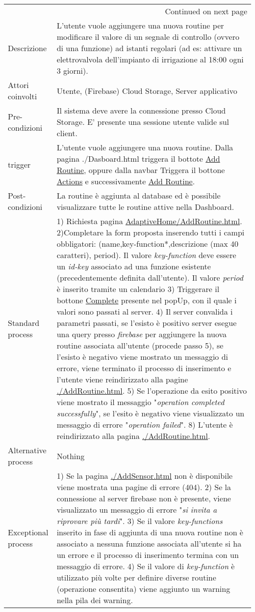 \documentclass[onecolumn,a4paper]{article}
\begin{document}
\begin{longtable}{|l|p{9.7cm}|}
\hline
\endhead
\hline\multicolumn{2}{r}{Continued on next page} \\
\endfoot
\endlastfoot
\hline
Descrizione & L'utente vuole aggiungere una nuova routine per modificare il valore di un segnale di controllo (ovvero di una funzione) ad istanti regolari (ad es: attivare un elettrovalvola dell'impianto di irrigazione al 18:00 ogni 3 giorni).\\
\hline
Attori coinvolti & Utente, (Firebase) Cloud Storage, Server applicativo\\
\hline
Pre-condizioni & Il sistema deve avere la connessione presso Cloud Storage. E' presente una sessione utente valide sul client.\\
\hline
trigger & L'utente vuole aggiungere una nuova routine. Dalla pagina ./Dasboard.html triggera il bottote \uline{Add Routine}, oppure dalla navbar Triggera il bottone \uline{Actions} e successivamente \uline{Add Routine}.\\
\hline
Post-condizioni & La routine è aggiunta al database ed è possibile visualizzare tutte le routine attive nella Dashboard.\\
\hline
Standard process & 1) Richiesta pagina \uline{AdaptiveHome/AddRoutine.html}. 2)Completare la form proposta inserendo tutti i campi obbligatori: (name,key-function*,descrizione (max 40 caratteri), period). Il valore \emph{key-function} deve essere un \emph{id-key} associato ad una funzione esistente (precedentemente definita dall'utente). Il valore \emph{period} è inserito tramite un calendario 3) Triggerare il bottone \uline{Complete} presente nel popUp, con il quale i valori sono passati al server. 4) Il server convalida i parametri passati, se l'esisto è positivo server esegue una query presso \emph{firebase} per aggiungere la nuova routine associata all'utente (procede passo 5), se l'esisto è negativo viene mostrato un messaggio di errore, viene terminato il processo di inserimento e l'utente viene reindirizzato alla pagine \uline{./AddRoutine.html}. 5) Se l'operazione da esito positivo viene mostrato il messaggio "\emph{operation completed successfully}", se l'esito è negativo viene visualizzato un messaggio di errore "\emph{operation failed}". 8) L'utente è reindirizzato alla pagina \uline{./AddRoutine.html}.\\
\hline
Alternative process & Nothing\\
\hline
Exceptional process & 1) Se la pagina \uline{./AddSensor.html} non è disponibile viene mostrata una pagine di errore (404). 2) Se la connessione al server firebase non è presente, viene visualizzato un messaggio di errore "\emph{si invita a riprovare più tardi}". 3) Se il valore \emph{key-functions} inserito in fase di aggiunta di una nuova routine  non è associato a nessuna funzione associata all'utente si ha un errore e il processo di inserimento termina con un messaggio di errore. 4) Se il valore di \emph{key-function} è utilizzato più volte per definire diverse routine (operazione consentita) viene aggiunto un warning nella pila dei warning.\\
\hline
\end{longtable}
\end{document}

